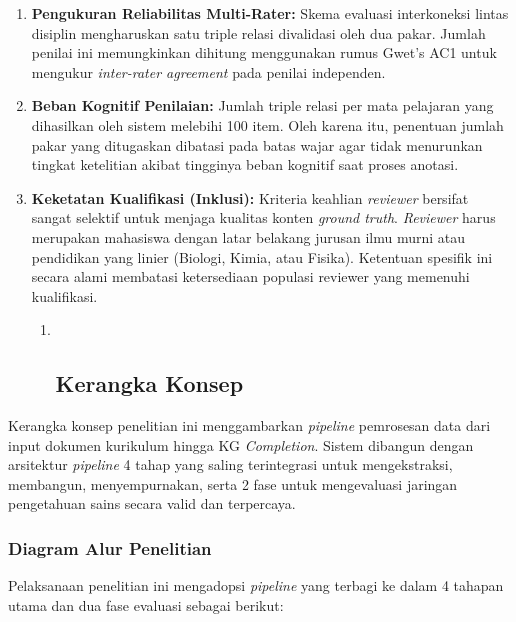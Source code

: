 \documentclass[
]{article}
\begin{document}
\begin{enumerate}
\def\labelenumi{\arabic{enumi}.}
\item
  \textbf{Pengukuran Reliabilitas Multi-Rater:} Skema evaluasi
  interkoneksi lintas disiplin mengharuskan satu triple relasi
  divalidasi oleh dua pakar. Jumlah penilai ini memungkinkan dihitung
  menggunakan rumus Gwet's AC1 untuk mengukur \emph{inter-rater
  agreement} pada penilai independen.
\item
  \textbf{Beban Kognitif Penilaian:} Jumlah triple relasi per mata
  pelajaran yang dihasilkan oleh sistem melebihi 100 item. Oleh karena
  itu, penentuan jumlah pakar yang ditugaskan dibatasi pada batas wajar
  agar tidak menurunkan tingkat ketelitian akibat tingginya beban
  kognitif saat proses anotasi.
\item
  \textbf{Keketatan Kualifikasi (Inklusi):} Kriteria keahlian
  \emph{reviewer} bersifat sangat selektif untuk menjaga kualitas konten
  \emph{ground truth}. \emph{Reviewer} harus merupakan mahasiswa dengan
  latar belakang jurusan ilmu murni atau pendidikan yang linier
  (Biologi, Kimia, atau Fisika). Ketentuan spesifik ini secara alami
  membatasi ketersediaan populasi reviewer yang memenuhi kualifikasi.

  \begin{enumerate}
  \def\labelenumii{\arabic{enumii}.}
  \item ~
    \hypertarget{kerangka-konsep}{%
    \subsection{Kerangka Konsep}\label{kerangka-konsep}}
  \end{enumerate}
\end{enumerate}

Kerangka konsep penelitian ini menggambarkan \emph{pipeline} pemrosesan
data dari input dokumen kurikulum hingga KG \emph{Completion}. Sistem
dibangun dengan arsitektur \emph{pipeline} 4 tahap yang saling
terintegrasi untuk mengekstraksi, membangun, menyempurnakan, serta 2
fase untuk mengevaluasi jaringan pengetahuan sains secara valid dan
terpercaya.

\hypertarget{diagram-alur-penelitian}{%
\subsubsection{Diagram Alur Penelitian}\label{diagram-alur-penelitian}}

Pelaksanaan penelitian ini mengadopsi \emph{pipeline} yang terbagi ke
dalam 4 tahapan utama dan dua fase evaluasi sebagai berikut:
\end{document}
